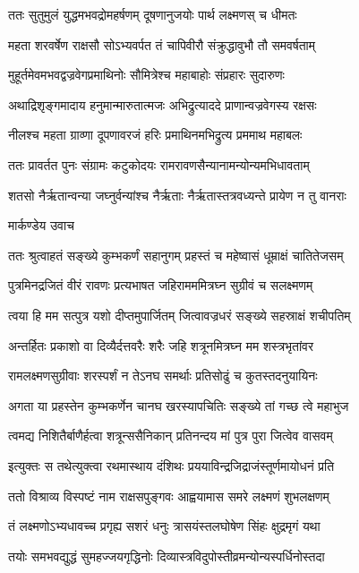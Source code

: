 \twolineshloka
{ततः सुतुमुलं युद्धमभवद्रोमहर्षणम्}
{दूषणानुजयोः पार्थ लक्ष्मणस् च धीमतः}


\twolineshloka
{महता शरवर्षेण राक्षसौ सोऽभ्यवर्पत}
{तं चापिवीरौ संक्रुद्धावुभौ तौ समवर्षताम्}


\twolineshloka
{मुहूर्तमेवमभवद्वज्रवेगप्रमाथिनोः}
{सौमित्रेश्च महाबाहोः संप्रहारः सुदारुणः}


\twolineshloka
{अथाद्रिशृङ्गमादाय हनुमान्मारुतात्मजः}
{अभिद्रुत्याददे प्राणान्वज्रवेगस्य रक्षसः}


\twolineshloka
{नीलश्च महता ग्राव्णा दूपणावरजं हरिः}
{प्रमाथिनमभिद्रुत्य प्रममाथ महाबलः}


\twolineshloka
{ततः प्रावर्तत पुनः संग्रामः कटुकोदयः}
{रामरावणसैन्यानामन्योन्यमभिधावताम्}


\twolineshloka
{शतसो नैर्ऋतान्वन्या जघ्नुर्वन्यांश्च नैर्ऋताः}
{नैर्ऋतास्तत्रवध्यन्ते प्रायेण न तु वानराः}


\twolineshloka
{मार्कण्डेय उवाच}
{}


\twolineshloka
{ततः श्रुत्वाहतं सङ्ख्ये कुम्भकर्णं सहानुगम्}
{प्रहस्तं च महेष्वासं धूम्राक्षं चातितेजसम्}


\twolineshloka
{पुत्रमिनद्रजितं वीरं रावणः प्रत्यभाषत}
{जहिरामममित्रघ्न सुग्रीवं च सलक्ष्मणम्}


\twolineshloka
{त्वया हि मम सत्पुत्र यशो दीप्तमुपार्जितम्}
{जित्वावज्रधरं सङ्ख्ये सहस्राक्षं शचीपतिम्}


\twolineshloka
{अन्तर्हितः प्रकाशो वा दिव्यैर्दत्तवरैः शरैः}
{जहि शत्रूनमित्रघ्न मम शस्त्रभृतांवर}


\twolineshloka
{रामलक्ष्मणसुग्रीवाः शरस्पर्शं न तेऽनघ}
{समर्थाः प्रतिसोढुं च कुतस्तदनुयायिनः}


\twolineshloka
{अगता या प्रहस्तेन कुम्भकर्णेन चानघ}
{खरस्यापचितिः सङ्ख्ये तां गच्छ त्वे महाभुज}


\twolineshloka
{त्वमद्य निशितैर्बाणैर्हत्वा शत्रून्ससैनिकान्}
{प्रतिनन्दय मां पुत्र पुरा जित्वेव वासवम्}


\twolineshloka
{इत्युक्तः स तथेत्युक्त्वा रथमास्थाय दंशिथः}
{प्रययाविन्द्रजिद्राजंस्तूर्णमायोधनं प्रति}


\twolineshloka
{ततो विश्राव्य विस्पष्टं नाम राक्षसपुङ्गवः}
{आह्वयामास समरे लक्ष्मणं शुभलक्षणम्}


\twolineshloka
{तं लक्ष्मणोऽभ्यधावच्च प्रगृह्य सशरं धनुः}
{त्रासयंस्तलघोषेण सिंहः क्षुद्रमृगं यथा}


\twolineshloka
{तयोः समभवद्युद्धं सुमहज्जयगृद्धिनोः}
{दिव्यास्त्रविदुपोस्तीव्रमन्योन्यस्पर्धिनोस्तदा}


